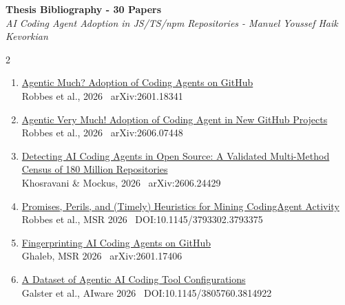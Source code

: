 \documentclass[a4paper,10pt]{article}
\begin{document}
\begin{center}
  {\large\bfseries Thesis Bibliography - 30 Papers}\\[3pt]
  {\small\itshape AI Coding Agent Adoption in JS/TS/npm Repositories%
    \quad -  Manuel Youssef Haik Kevorkian}
\end{center}

\vspace{4pt}
\begin{multicols}{2}
\footnotesize
\setlength{\parskip}{0pt}
\begin{enumerate}[leftmargin=1.6em, topsep=2pt, itemsep=3.5pt, parsep=0pt]

\item \href{https://arxiv.org/abs/2601.18341}%
  {Agentic Much? Adoption of Coding Agents on GitHub}\\
  {\scriptsize Robbes et al., 2026 \textbar\ arXiv:2601.18341}

\item \href{https://arxiv.org/abs/2606.07448}%
  {Agentic Very Much! Adoption of Coding Agent in New GitHub Projects}\\
  {\scriptsize Robbes et al., 2026 \textbar\ arXiv:2606.07448}

\item \href{https://arxiv.org/abs/2606.24429}%
  {Detecting AI Coding Agents in Open Source: A
Validated Multi-Method Census of 180 Million
Repositories}\\
  {\scriptsize Khosravani \& Mockus, 2026 \textbar\ arXiv:2606.24429}

\item \href{https://doi.org/10.1145/3793302.3793375}%
  {Promises, Perils, and (Timely) Heuristics for Mining CodingAgent Activity}\\
  {\scriptsize Robbes et al., MSR 2026 \textbar\ DOI:10.1145/3793302.3793375}

\item \href{https://arxiv.org/abs/2601.17406}%
  {Fingerprinting AI Coding Agents on GitHub}\\
  {\scriptsize Ghaleb, MSR 2026 \textbar\ arXiv:2601.17406}

\item \href{https://doi.org/10.1145/3805760.3814922}%
  {A Dataset of Agentic AI Coding Tool Configurations}\\
  {\scriptsize Galster et al., AIware 2026 \textbar\ DOI:10.1145/3805760.3814922}


\end{enumerate}
\end{multicols}
\end{document}
